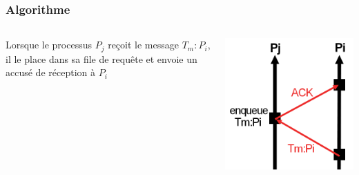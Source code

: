 \documentclass[compress]{beamer}
\begin{document}
\begin{frame}
\frametitle{Algorithme}
	\begin{columns}
    	\begin{column}{.6\textwidth}
			Lorsque le processus $P_j$ reçoit le message $T_m : P_i$, il le place dans sa file de requête et envoie un accusé de réception à $P_i$
		\end{column}
		\begin{column}{.4\textwidth}
		\begin{center}
				\includegraphics[scale=0.5]{process9.png}
		\end{center}
		\end{column}
	\end{columns}
	

\end{frame}
\end{document}

